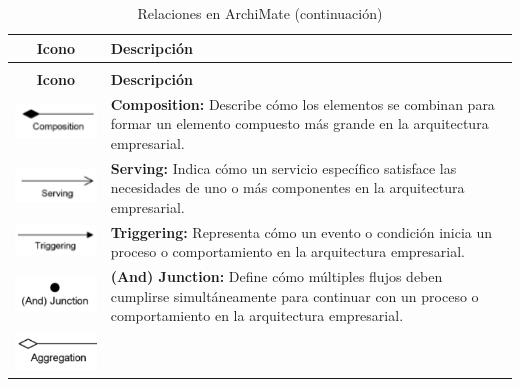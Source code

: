 \begin{longtable}{|c|p{8cm}|}
\caption{Relaciones en ArchiMate} \label{tab:relaciones-archimate} \\
\hline
\textbf{Icono} & \textbf{Descripción} \\
\hline
\endfirsthead

\caption[]{Relaciones en ArchiMate (continuación)} \\
\hline
\textbf{Icono} & \textbf{Descripción} \\
\hline
\endhead

\hline
\endfoot

\endlastfoot
\includegraphics{anexos/ARCHI/relations/compostion.png} & 
\textbf{Composition:} Describe cómo los elementos se combinan para formar un elemento compuesto más grande en la arquitectura empresarial. \\
\hline
\includegraphics{anexos/ARCHI/relations/serving.png} & 
\textbf{Serving:} Indica cómo un servicio específico satisface las necesidades de uno o más componentes en la arquitectura empresarial. \\
\hline
\includegraphics{anexos/ARCHI/relations/triggering.png} & 
\textbf{Triggering:} Representa cómo un evento o condición inicia un proceso o comportamiento en la arquitectura empresarial. \\
\hline
\includegraphics{anexos/ARCHI/relations/and.png} & 
\textbf{(And) Junction:} Define cómo múltiples flujos deben cumplirse simultáneamente para continuar con un proceso o comportamiento en la arquitectura empresarial. \\
\hline
\includegraphics{anexos/ARCHI/relations/aggregation.png} & 

\end{longtable}
